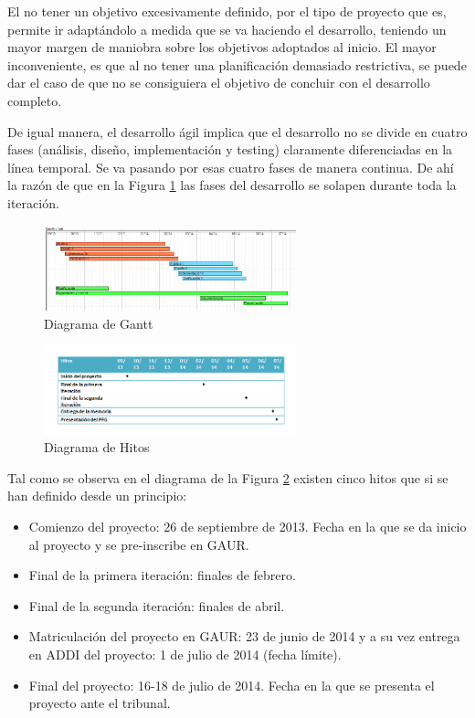 El no tener un objetivo excesivamente definido, por el tipo de proyecto que es, permite ir adaptándolo a medida que se va haciendo el desarrollo, teniendo un mayor margen de maniobra sobre los objetivos adoptados al inicio. El mayor inconveniente, es que al no tener una planificación demasiado restrictiva, se puede dar el caso de que no se consiguiera el objetivo de concluir con el desarrollo completo.

De igual manera, el desarrollo ágil implica que el desarrollo no se divide en cuatro fases (análisis, diseño, implementación y testing) claramente diferenciadas en la línea temporal. Se va pasando por esas cuatro fases de manera continua. De ahí la razón de que en la Figura \ref{fig:Gantt} las fases del desarrollo se solapen durante toda la iteración.

\begin{figure}
\begin{center}
\includegraphics[width=0.65\textwidth]{figs/6-Gantt.png}
\caption{Diagrama de Gantt}
\label{fig:Gantt}
\end{center}
\end{figure}

\begin{figure}
\begin{center}
\includegraphics[width=0.65\textwidth]{figs/6-Hitos.png}
\caption{Diagrama de Hitos}
\label{fig:Hitos}
\end{center}
\end{figure}

Tal como se observa en el diagrama de la Figura \ref{fig:Hitos} existen cinco hitos que si se han definido desde un principio:

\begin{itemize}
\item{Comienzo del proyecto: 26 de septiembre de 2013. Fecha en la que se da inicio al proyecto y se pre-inscribe en GAUR.}
\item{Final de la primera iteración: finales de febrero.}
\item{Final de la segunda iteración: finales de abril.}
\item{Matriculación del proyecto en GAUR: 23 de junio de 2014 y a su vez entrega en ADDI del proyecto: 1 de julio de 2014 (fecha límite).}
\item{Final del proyecto: 16-18 de julio de 2014. Fecha en la que se presenta el proyecto ante el tribunal.}
\end{itemize}

